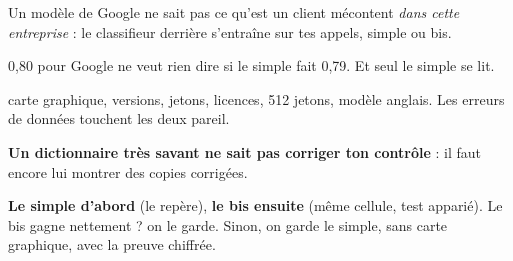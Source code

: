 \begin{tcbraster}[raster columns=3, raster equal height, raster column skip=6pt]
\begin{kpibox}[title={\faGraduationCap\ Il faut apprendre}, unbreakable]
\small Un modèle de Google ne sait pas ce qu'est un client mécontent \emph{dans cette entreprise} : le classifieur
derrière s'entraîne sur tes appels, simple ou bis.
\end{kpibox}
\begin{kpibox}[title={\faBalanceScale\ Le simple est le témoin}, unbreakable]
\small 0,80 pour Google ne veut rien dire si le simple fait 0,79. Et seul le simple se lit.
\end{kpibox}
\begin{kpibox}[title={\faTools\ Le bis casse plus}, unbreakable]
\small carte graphique, versions, jetons, licences, 512 jetons, modèle anglais. Les erreurs de données
touchent les deux pareil.
\end{kpibox}
\end{tcbraster}

\begin{enfant}
\textbf{Un dictionnaire très savant ne sait pas corriger ton contrôle} : il faut encore lui montrer des
copies corrigées.
\end{enfant}

\begin{stepbox}[title={\faRoute\quad La règle}]
\textbf{Le simple d'abord} (le repère), \textbf{le bis ensuite} (même cellule, test apparié). Le bis
gagne nettement ? on le garde. Sinon, on garde le simple, sans carte graphique, avec la preuve chiffrée.
\end{stepbox}
